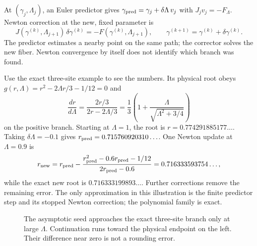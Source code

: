 \documentclass[11pt]{article}
\begin{document}
At $(\gamma_j,\Lambda_j)$, an Euler predictor gives
$\gamma_{\rm pred}=\gamma_j+\delta\Lambda\,v_j$ with
$J_jv_j=-F_\Lambda$. Newton correction at the new, fixed parameter is
\[
 J(\gamma^{(k)},\Lambda_{j+1})\,\delta\gamma^{(k)}
 =-F(\gamma^{(k)},\Lambda_{j+1}),\qquad
 \gamma^{(k+1)}=\gamma^{(k)}+\delta\gamma^{(k)}.
\]
The predictor estimates a nearby point on the same path; the corrector
solves the new fiber. Newton convergence by itself does not identify
which branch was found.

Use the exact three-site example to see the numbers. Its physical root
obeys $g(r,\Lambda)=r^2-2\Lambda r/3-1/12=0$ and
\[
 \frac{dr}{d\Lambda}=\frac{2r/3}{2r-2\Lambda/3}
 =\frac13\left(1+\frac{\Lambda}{\sqrt{\Lambda^2+3/4}}\right)
\]
on the positive branch. Starting at $\Lambda=1$, the root is
$r=0.774291885177\ldots$. Taking $\delta\Lambda=-0.1$ gives
$r_{\rm pred}=0.715760920310\ldots$.
One Newton update at $\Lambda=0.9$ is
\[
 r_{\rm new}=r_{\rm pred}
 -\frac{r_{\rm pred}^2-0.6r_{\rm pred}-1/12}
             {2r_{\rm pred}-0.6}
 =0.716333593754\ldots,
\]
while the exact new root is $0.716333199893\ldots$.
Further corrections remove the remaining error. The only approximation
in this illustration is the finite predictor step and its stopped
Newton correction; the polynomial family is exact.

\begin{figure}[htbp]
\centering
{}
\caption{The asymptotic seed approaches the exact three-site branch
only at large $\Lambda$. Continuation runs toward the physical endpoint
on the left. Their difference near zero is not a rounding error.}
\label{fig:exact-asymptotic-path}
\end{figure}
\end{document}
